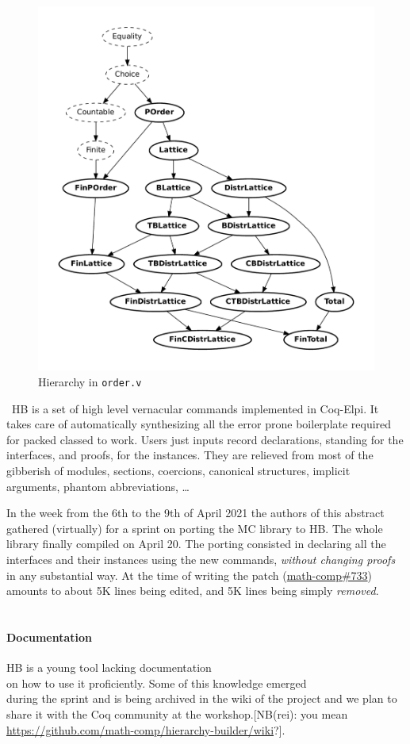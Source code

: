 \documentclass{easychair}
\def\MC{{\sf MC}}
\def\HB{{\sf HB}}
\begin{document}
\begin{figure}
  \vspace{-1em}
	\includegraphics[width=.40\textwidth]{order.pdf}
  \caption{\small Hierarchy in {\tt order.v}}
	\label{fig:order}
  
\end{figure}
\
\HB{} is a set of high level vernacular commands implemented in Coq-Elpi. It takes
care of automatically synthesizing all the error prone boilerplate required for
packed classed to work. Users just inputs record declarations,
standing for the interfaces, and proofs, for the instances.
They are relieved from
most of the gibberish of modules, sections, coercions, canonical
structures, implicit arguments, phantom abbreviations, \ldots

In the week from the 6th to the 9th of April 2021 the authors of this abstract
gathered (virtually) for a sprint on porting the \MC{} library to
\HB{}. The whole library finally compiled on April 20.
The porting consisted in declaring all the interfaces and their instances
using the new commands, \emph{without changing proofs} in any substantial way.
At the time of writing the patch (\href{https://github.com/math-comp/math-comp/pull/733}{math-comp\#733})
amounts to about 5K lines being edited, and 5K lines being simply \emph{removed}.\\
\
\paragraph{Documentation}
\HB{} is a young tool lacking documentation\\
on how to use it proficiently. Some of this knowledge emerged\\
during the sprint and is being archived in the wiki of the project and we
plan to share it with the Coq community at the workshop.[NB(rei): you mean \url{https://github.com/math-comp/hierarchy-builder/wiki}?].
\end{document}
